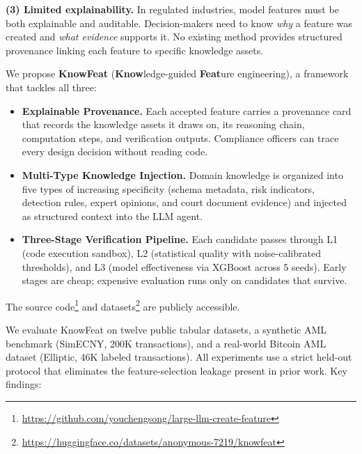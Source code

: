 \textbf{(3) Limited explainability.}
In regulated industries, model features must be both explainable and auditable. Decision-makers need to know \emph{why} a feature was created and \emph{what evidence} supports it. No existing method provides structured provenance linking each feature to specific knowledge assets.

We propose \textbf{KnowFeat} (\textbf{Know}ledge-guided \textbf{Feat}ure engineering), a framework that tackles all three:

\begin{itemize}
    \item \textbf{Explainable Provenance.} Each accepted feature carries a provenance card that records the knowledge assets it draws on, its reasoning chain, computation steps, and verification outputs. Compliance officers can trace every design decision without reading code.

    \item \textbf{Multi-Type Knowledge Injection.} Domain knowledge is organized into five types of increasing specificity (schema metadata, risk indicators, detection rules, expert opinions, and court document evidence) and injected as structured context into the LLM agent.

    \item \textbf{Three-Stage Verification Pipeline.} Each candidate passes through L1 (code execution sandbox), L2 (statistical quality with noise-calibrated thresholds), and L3 (model effectiveness via XGBoost across 5 seeds). Early stages are cheap; expensive evaluation runs only on candidates that survive.

\end{itemize}

The source code\footnote{\url{https://github.com/youchengsong/large-llm-create-feature}} and datasets\footnote{\url{https://huggingface.co/datasets/anonymous-7219/knowfeat}} are publicly accessible.

We evaluate KnowFeat on twelve public tabular datasets, a synthetic AML benchmark (SimECNY, 200K transactions), and a real-world Bitcoin AML dataset (Elliptic, 46K labeled transactions). All experiments use a strict held-out protocol that eliminates the feature-selection leakage present in prior work. Key findings:

